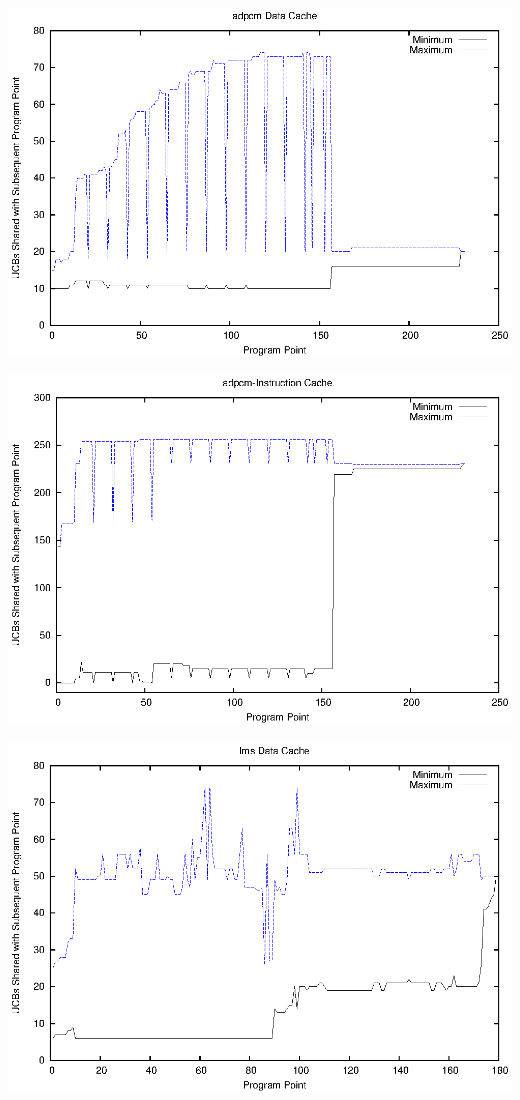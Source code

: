 \begin{center}
  \includegraphics[width=\linewidth]{eps/adpcm-dcache.eps}
\end{center}

\begin{center}
  \includegraphics[width=\linewidth]{eps/adpcm-icache.eps}
\end{center}


\begin{center}
  \includegraphics[width=\linewidth]{eps/lms-dcache.eps}
\end{center}

